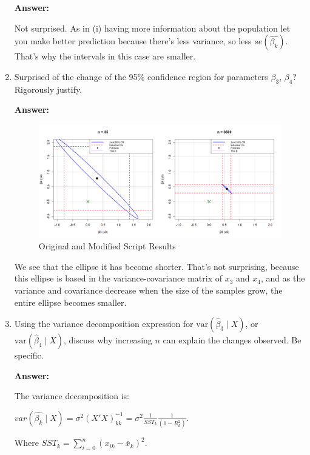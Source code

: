 \documentclass[12pt,a4paper]{article}
\begin{document}
\begin{enumerate}[label=(\roman*)]
  \textbf{Answer:}

  Not surprised. As in (i) having more information about the population let you make better prediction because there's less variance, so less $se(\hat{\beta_k})$. That's why the intervals in this case are smaller.
  
  
  \item Surprised of the change of the 95\% confidence region for parameters $\beta_3$, $\beta_4$? Rigorously justify.
  
  \textbf{Answer:} 

    \begin{figure}[H]  
      \centering
      \includegraphics[width=1\textwidth]{Files/elipse_comparison.png}
      \caption{Original and Modified Script Results}
      \label{fig:ellipse}
    \end{figure}

  We see that the ellipse it has become shorter. That's not surprising, because this ellipse is based in the variance-covariance matrix of $x_3$ and $x_4$, and as the variance and covariance decrease when the size of the samples grow, the entire ellipse becomes smaller. 
  
  \item Using the variance decomposition expression for $\text{var}(\hat{\beta}_3 \mid X)$, or $\text{var}(\hat{\beta}_4 \mid X)$, discuss why increasing $n$ can explain the changes observed. Be specific.
  
  \textbf{Answer:} 

The variance decomposition is:
\begin{center}
    
$var(\hat{\beta_k}\mid X) = \sigma^2(X'X)^{-1}_{kk}= \sigma^2 \frac{1}{SST_k} \frac{1}{(1-R_k^2)}$.
\end{center}

Where $SST_k = \sum^n_{i=0}(x_{ik}-\bar{x}_k)^2$. 


\end{enumerate}
\end{document}
